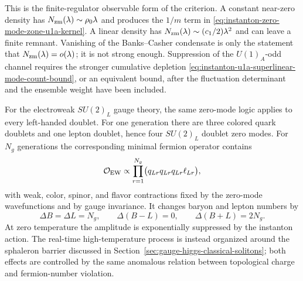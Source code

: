 \begin{controlledapproximation}
This is the finite-regulator observable form of the criterion.  A constant
near-zero density has \(N_{\rm zm}(\lambda)\sim\rho_0\lambda\) and produces
the \(1/m\) term in
\eqref{eq:instanton-zero-mode-zone-u1a-kernel}.  A linear density has
\(N_{\rm zm}(\lambda)\sim(c_1/2)\lambda^2\) and can leave a finite remnant.
Vanishing of the Banks--Casher condensate is only the statement that
\(N_{\rm zm}(\lambda)=o(\lambda)\); it is not strong enough.  Suppression of
the \(U(1)_A\)-odd channel requires the stronger cumulative depletion
\eqref{eq:instanton-u1a-superlinear-mode-count-bound}, or an equivalent
bound, after the fluctuation determinant and the ensemble weight have been
included.
\end{controlledapproximation}

For the electroweak \(SU(2)_L\) gauge theory, the same zero-mode logic applies
to every left-handed doublet.  For one generation there are three colored
quark doublets and one lepton doublet, hence four \(SU(2)_L\) doublet zero
modes.  For \(N_g\) generations the corresponding minimal fermion operator
contains
\begin{equation}
  \mathcal O_{\rm EW}
  \propto
  \prod_{r=1}^{N_g}
  \bigl(q_{Lr}q_{Lr}q_{Lr}\ell_{Lr}\bigr),
  \label{eq:electroweak-thooft-vertex}
\end{equation}
with weak, color, spinor, and flavor contractions fixed by the zero-mode
wavefunctions and by gauge invariance.  It changes baryon and lepton numbers
by
\[
  \Delta B=\Delta L=N_g,
  \qquad
  \Delta(B-L)=0,
  \qquad
  \Delta(B+L)=2N_g .
\]
At zero temperature the amplitude is exponentially suppressed by the instanton
action.  The real-time high-temperature process is instead organized around
the sphaleron barrier discussed in
Section~\ref{sec:gauge-higgs-classical-solitons}; both effects are controlled
by the same anomalous relation between topological charge and fermion-number
violation.

